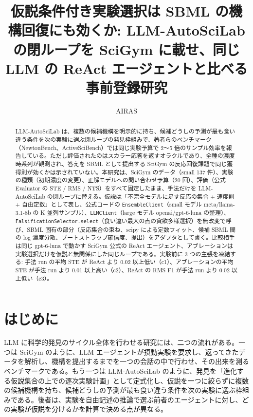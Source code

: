 \documentclass{article}
\title{仮説条件付き実験選択は SBML の機構回復にも効くか: LLM-AutoSciLab の閉ループを SciGym に載せ、同じ LLM の ReAct エージェントと比べる事前登録研究}
\author{AIRAS}
\begin{document}
\maketitle

\begin{abstract}
LLM-AutoSciLab \citep{kabra-2026-llm} は、複数の候補機構を明示的に持ち、候補どうしの予測が最も食い違う条件を次の実験に選ぶ閉ループの発見枠組みで、著者らのベンチマーク（NewtonBench、ActiveSciBench）では同じ実験予算で 2〜5 倍のサンプル効率を報告している。ただし評価されたのはスカラー応答を返すオラクルであり、全種の濃度時系列が観測され、答えを SBML として提出する SciGym \citep{duan-2025-measuring} の反応回復課題で同じ獲得則が効くかは示されていない。本研究は、SciGym のデータ（small 137 件）、実験の種類（初期濃度の変更）、正解モデルへの問い合わせ予算（20 回）、評価（公式 Evaluator の STE / RMS / NTS）をすべて固定したまま、手法だけを LLM-AutoSciLab の閉ループに替える。仮説は「不完全モデルに足す反応の集合 + 速度則 + 自由定数」として表し、公式コードの \texttt{EnsembleClient}（small モデル meta/llama-3.1-8b の K 並列サンプル）、\texttt{LLMClient}（large モデル openai/gpt-6-luna の整理）、\texttt{FalsificationSelector.select}（食い違い最大の点の貪欲多様選択）を無改変で呼び、SBML 固有の部分（反応集合の束ね、scipy による定数フィット、候補 SBML 間の log 濃度分散、ブートストラップ確信度、提出）をアダプタとして書く。比較相手は同じ gpt-6-luna で動かす SciGym 公式の ReAct エージェント、アブレーションは実験選択だけを仮説と無関係にした同じループである。実験前に 3 つの主張を凍結する: 手法 run の平均 STE が ReAct より 0.02 以上低い（c1）、アブレーションの平均 STE が手法 run より 0.01 以上高い（c2）、ReAct の RMS F1 が手法 run より 0.02 以上低い（c3）。
\end{abstract}

\section{はじめに}
\label{sec:intro}
LLM に科学的発見のサイクル全体を行わせる研究には、二つの流れがある。一つは SciGym \citep{duan-2025-measuring} のように、LLM エージェントが摂動実験を要求し、返ってきたデータを解析し、機構を提出するまでを一つの会話の中で行わせ、その出来を測るベンチマークである。もう一つは LLM-AutoSciLab \citep{kabra-2026-llm} のように、発見を「進化する仮説集合の上での逐次実験計画」として定式化し、仮説を一つに絞らずに複数の候補機構を持ち、候補どうしの予測が最も食い違う条件を次の実験に選ぶ枠組みである。後者は、実験を自由記述の推論で選ぶ前者のエージェントに対し、どの実験が仮説を分けるかを計算で決める点が異なる。
\end{document}

